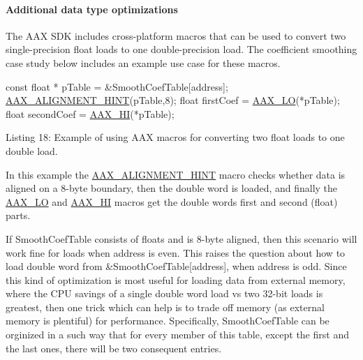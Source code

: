 \hypertarget{a00362_subsubsection__additional_data_type_optimizations_}{}\paragraph{Additional data type optimizations}\label{a00362_subsubsection__additional_data_type_optimizations_}
 The A\+A\+X S\+D\+K includes cross-\/platform macros that can be used to convert two single-\/precision float loads to one double-\/precision load. The coefficient smoothing case study below includes an example use case for these macros.


\begin{DoxyCode}
\textcolor{keyword}{const} \textcolor{keywordtype}{float} * pTable = &SmoothCoefTable[address];
\hyperlink{a00271_a7eb399409be7572c8bd589395c450cdc}{AAX\_ALIGNMENT\_HINT}(pTable,8);
\textcolor{keywordtype}{float} firstCoef  = \hyperlink{a00271_a30b9af679d91539e6aa0871d36c4b024}{AAX\_LO}(*pTable);
\textcolor{keywordtype}{float} secondCoef = \hyperlink{a00271_a51ea059e820f6ca326531adb132183c3}{AAX\_HI}(*pTable);
\end{DoxyCode}
  Listing 18\+: Example of using A\+A\+X macros for converting two {\ttfamily float} loads to one {\ttfamily double} load.

In this example the \hyperlink{a00271_a7eb399409be7572c8bd589395c450cdc}{A\+A\+X\+\_\+\+A\+L\+I\+G\+N\+M\+E\+N\+T\+\_\+\+H\+I\+N\+T} macro checks whether data is aligned on a 8-\/byte boundary, then the double word is loaded, and finally the \hyperlink{a00271_a30b9af679d91539e6aa0871d36c4b024}{A\+A\+X\+\_\+\+L\+O} and \hyperlink{a00271_a51ea059e820f6ca326531adb132183c3}{A\+A\+X\+\_\+\+H\+I} macros get the double word\textquotesingle{}s first and second ({\ttfamily float}) parts.

If {\ttfamily Smooth\+Coef\+Table} consists of floats and is 8-\/byte aligned, then this scenario will work fine for loads when {\ttfamily address} is even. This raises the question about how to load double word from {\ttfamily \&Smooth\+Coef\+Table\mbox{[}address\mbox{]}}, when {\ttfamily address} is odd. Since this kind of optimization is most useful for loading data from external memory, where the C\+P\+U savings of a single double word load vs two 32-\/bit loads is greatest, then one trick which can help is to trade off memory (as external memory is plentiful) for performance. Specifically, {\ttfamily Smooth\+Coef\+Table} can be orginized in a such way that for every member of this table, except the first and the last ones, there will be two consequent entries.


